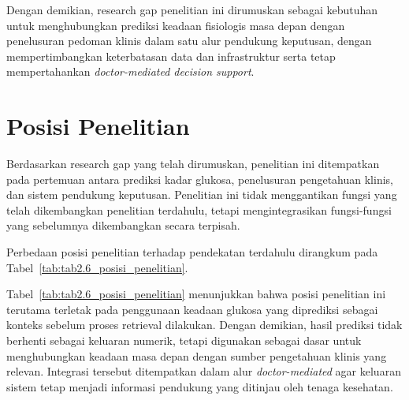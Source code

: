Dengan demikian, research gap penelitian ini dirumuskan sebagai kebutuhan untuk menghubungkan prediksi keadaan fisiologis masa depan dengan penelusuran pedoman klinis dalam satu 
alur pendukung keputusan, dengan mempertimbangkan keterbatasan data dan infrastruktur serta tetap mempertahankan \textit{doctor-mediated decision support}.

\section{Posisi Penelitian}
\label{sec:bab2-posisi-penelitian}

Berdasarkan research gap yang telah dirumuskan, penelitian ini ditempatkan pada pertemuan antara prediksi kadar glukosa, penelusuran pengetahuan klinis, dan sistem pendukung 
keputusan. Penelitian ini tidak menggantikan fungsi yang telah dikembangkan penelitian terdahulu, tetapi mengintegrasikan fungsi-fungsi yang sebelumnya dikembangkan secara terpisah.

Perbedaan posisi penelitian terhadap pendekatan terdahulu dirangkum pada Tabel~\ref{tab:tab2.6_posisi_penelitian}.



Tabel~\ref{tab:tab2.6_posisi_penelitian} menunjukkan bahwa posisi penelitian ini terutama terletak pada penggunaan keadaan glukosa yang diprediksi sebagai konteks sebelum proses 
retrieval dilakukan. Dengan demikian, hasil prediksi tidak berhenti sebagai keluaran numerik, tetapi digunakan sebagai dasar untuk menghubungkan keadaan masa depan dengan sumber 
pengetahuan klinis yang relevan. Integrasi tersebut ditempatkan dalam alur \textit{doctor-mediated} agar keluaran sistem tetap menjadi informasi pendukung yang ditinjau oleh
tenaga kesehatan.

